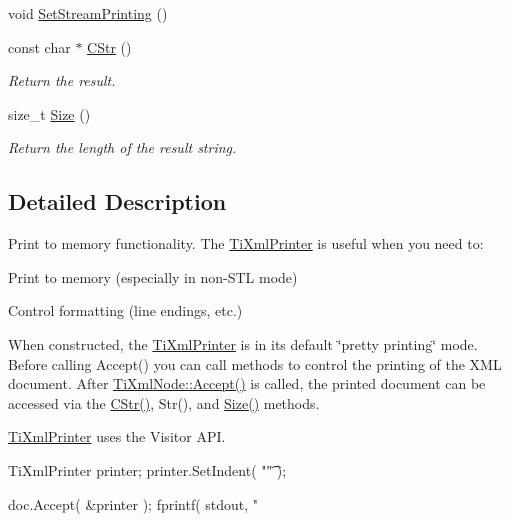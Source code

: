 \begin{DoxyCompactItemize}
void \hyperlink{class_ti_xml_printer_ab23a90629e374cb1cadca090468bbd19}{Set\+Stream\+Printing} ()
\item 
const char $\ast$ \hyperlink{class_ti_xml_printer_a859eede9597d3e0355b77757be48735e}{C\+Str} ()
\begin{DoxyCompactList}\small\item\em Return the result. \end{DoxyCompactList}\item 
size\+\_\+t \hyperlink{class_ti_xml_printer_ad01375ae9199bd2f48252eaddce3039d}{Size} ()
\begin{DoxyCompactList}\small\item\em Return the length of the result string. \end{DoxyCompactList}\end{DoxyCompactItemize}


\subsection{Detailed Description}
Print to memory functionality. The \hyperlink{class_ti_xml_printer}{Ti\+Xml\+Printer} is useful when you need to\+:


\begin{DoxyEnumerate}
\item Print to memory (especially in non-\/\+S\+T\+L mode)
\item Control formatting (line endings, etc.)
\end{DoxyEnumerate}

When constructed, the \hyperlink{class_ti_xml_printer}{Ti\+Xml\+Printer} is in its default \char`\"{}pretty printing\char`\"{} mode. Before calling Accept() you can call methods to control the printing of the X\+M\+L document. After \hyperlink{class_ti_xml_node_acc0f88b7462c6cb73809d410a4f5bb86}{Ti\+Xml\+Node\+::\+Accept()} is called, the printed document can be accessed via the \hyperlink{class_ti_xml_printer_a859eede9597d3e0355b77757be48735e}{C\+Str()}, Str(), and \hyperlink{class_ti_xml_printer_ad01375ae9199bd2f48252eaddce3039d}{Size()} methods.

\hyperlink{class_ti_xml_printer}{Ti\+Xml\+Printer} uses the Visitor A\+P\+I. \begin{DoxyVerb}TiXmlPrinter printer;
printer.SetIndent( "\t" );

doc.Accept( &printer );
fprintf( stdout, "%
\end{DoxyVerb}
 

